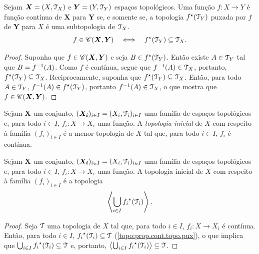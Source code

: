 \begin{proposition}
\label{topo:prop.cont.topo.pux}
Sejam $\bm X = (X,\mathcal{T}_ X)$ e $\bm Y = (Y,\mathcal{T}_ Y)$ espaços topológicos. Uma função $f: X \to Y$ é função contínua de $\bm X$ para $\bm Y$ se, e somente se, a topologia $f^\star(\mathcal{T}_Y)$ puxada por $f$ de $\bm Y$ para $X$ é uma subtopologia de $\mathcal{T}_ X$.
	\begin{equation*}
	f \in \mathscr{C}(\bm X,\bm Y) \quad \Longleftrightarrow \quad f^\star(\mathcal{T}_Y) \subseteq \mathcal{T}_X.
	\end{equation*}
\end{proposition}
\begin{proof}
Suponha que $f \in \mathscr{C}(\bm X,\bm Y)$ e seja $B \in f^\star(\mathcal{T}_Y)$. Então existe $A \in \mathcal{T}_Y$ tal que $B=f^{-1}(A)$. Como $f$ é contínua, segue que $f^{-1}(A) \in \mathcal{T}_X$, portanto, $f^\star(\mathcal{T}_Y) \subseteq \mathcal{T}_X$. Reciprocamente, suponha que $f^\star(\mathcal{T}_Y) \subseteq \mathcal{T}_X$. Então, para todo $A \in \mathcal{T}_Y$, $f^{-1}(A) \in f^\star(\mathcal{T}_Y)$, portanto $f^{-1}(A) \in \mathcal{T}_X$, o que mostra que $f \in \mathscr{C}(\bm X,\bm Y)$.
\end{proof}

\begin{definition}
Sejam $\bm X$ um conjunto, $(\bm{X_i})_{i \in I} = (X_i,\mathcal{T}_i)_{i \in I}$ uma família de espaços topológicos e, para todo $i \in I$, $f_i: X \to X_i$ uma função. A \emph{topologia inicial} de $X$ com respeito à família $(f_i)_{i \in I}$ é a menor topologia de $X$ tal que, para todo $i \in I$, $f_i$ é contínua.
\end{definition}

\begin{proposition}
Sejam $\bm X$ um conjunto, $(\bm{X_i})_{i \in I} = (X_i,\mathcal{T}_i)_{i \in I}$ uma família de espaços topológicos e, para todo $i \in I$, $f_i: X \to X_i$ uma função. A topologia inicial de $X$ com respeito à família $(f_i)_{i \in I}$ é a topologia
	\begin{equation*}
	\left\langle \bigcup_{i \in I} {f_i}^\star(\mathcal{T}_i) \right\rangle.
	\end{equation*}
\end{proposition}
\begin{proof}
Seja $\mathcal{T}$ uma topologia de $X$ tal que, para todo $i \in I$, $f_i: X \to X_i$ é contínua. Então, para todo $i \in I$, ${f_i}^\star(\mathcal{T}_i) \subseteq \mathcal{T}$ (\ref{topo:prop.cont.topo.pux}), o que implica que $\bigcup_{i \in I} {f_i}^\star(\mathcal{T}_i) \subseteq \mathcal{T}$ e, portanto, $\left\langle \bigcup_{i \in I} {f_i}^\star(\mathcal{T}_i) \right\rangle \subseteq \mathcal{T}$.
\end{proof}

